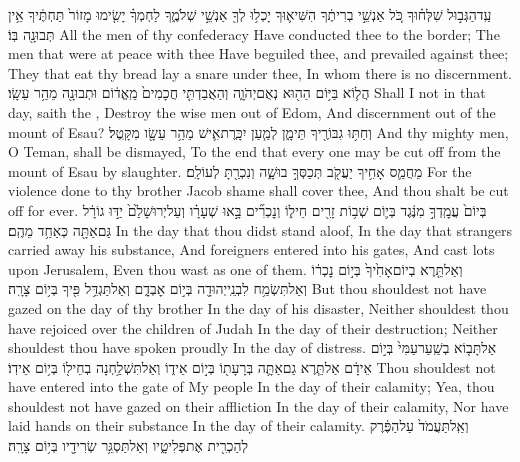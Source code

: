 {עַֽד\maqqaf הַגְּב֣וּל שִׁלְּח֗וּךָ כֹּ֚ל אַנְשֵׁ֣י בְרִיתֶ֔ךָ הִשִּׁיא֛וּךָ יָכְל֥וּ לְךָ֖ אַנְשֵׁ֣י שְׁלֹמֶ֑ךָ לַחְמְךָ֗ יָשִׂ֤ימוּ מָזוֹר֙ תַּחְתֶּ֔יךָ אֵ֥ין תְּבוּנָ֖ה בּֽוֹ׃}
{All the men of thy confederacy Have conducted thee to the border; The men that were at peace with thee Have beguiled thee, and prevailed against thee; They that eat thy bread lay a snare under thee, In whom there is no discernment.}
{הֲל֛וֹא בַּיּ֥וֹם הַה֖וּא נְאֻם\maqqaf יְהֹוָ֑ה וְהַאֲבַדְתִּ֤י חֲכָמִים֙ מֵֽאֱד֔וֹם וּתְבוּנָ֖ה מֵהַ֥ר עֵשָֽׂו׃}
{Shall I not in that day, saith the \lord, Destroy the wise men out of Edom, And discernment out of the mount of Esau?}
{וְחַתּ֥וּ גִבּוֹרֶ֖יךָ תֵּימָ֑ן לְמַ֧עַן יִכָּֽרֶת\maqqaf אִ֛ישׁ מֵהַ֥ר עֵשָׂ֖ו מִקָּֽטֶל׃}
{And thy mighty men, O Teman, shall be dismayed, To the end that every one may be cut off from the mount of Esau by slaughter.}
{מֵחֲמַ֛ס אָחִ֥יךָ יַעֲקֹ֖ב תְּכַסְּךָ֣ בוּשָׁ֑ה וְנִכְרַ֖תָּ לְעוֹלָֽם׃}
{For the violence done to thy brother Jacob shame shall cover thee, And thou shalt be cut off for ever.}
{בְּיוֹם֙ עֲמׇֽדְךָ֣ מִנֶּ֔גֶד בְּי֛וֹם שְׁב֥וֹת זָרִ֖ים חֵיל֑וֹ וְנׇכְרִ֞ים בָּ֣אוּ שְׁעָרָ֗ו וְעַל\maqqaf יְרוּשָׁלַ֙͏ִם֙ יַדּ֣וּ גוֹרָ֔ל גַּם\maqqaf אַתָּ֖ה כְּאַחַ֥ד מֵהֶֽם׃}
{In the day that thou didst stand aloof, In the day that strangers carried away his substance, And foreigners entered into his gates, And cast lots upon Jerusalem, Even thou wast as one of them.}
{וְאַל\maqqaf תֵּ֤רֶא בְיוֹם\maqqaf אָחִ֙יךָ֙ בְּי֣וֹם נׇכְר֔וֹ וְאַל\maqqaf תִּשְׂמַ֥ח לִבְנֵֽי\maqqaf יְהוּדָ֖ה בְּי֣וֹם אׇבְדָ֑ם וְאַל\maqqaf תַּגְדֵּ֥ל פִּ֖יךָ בְּי֥וֹם צָרָֽה׃}
{But thou shouldest not have gazed on the day of thy brother In the day of his disaster, Neither shouldest thou have rejoiced over the children of Judah In the day of their destruction; Neither shouldest thou have spoken proudly In the day of distress.}
{אַל\maqqaf תָּב֤וֹא בְשַֽׁעַר\maqqaf עַמִּי֙ בְּי֣וֹם אֵידָ֔ם אַל\maqqaf תֵּ֧רֶא גַם\maqqaf אַתָּ֛ה בְּרָעָת֖וֹ בְּי֣וֹם אֵיד֑וֹ וְאַל\maqqaf תִּשְׁלַ֥חְנָה בְחֵיל֖וֹ בְּי֥וֹם אֵידֽוֹ׃}
{Thou shouldest not have entered into the gate of My people In the day of their calamity; Yea, thou shouldest not have gazed on their affliction In the day of their calamity, Nor have laid hands on their substance In the day of their calamity.}
{וְאַֽל\maqqaf תַּעֲמֹד֙ עַל\maqqaf הַפֶּ֔רֶק לְהַכְרִ֖ית אֶת\maqqaf פְּלִיטָ֑יו וְאַל\maqqaf תַּסְגֵּ֥ר שְׂרִידָ֖יו בְּי֥וֹם צָרָֽה׃}
